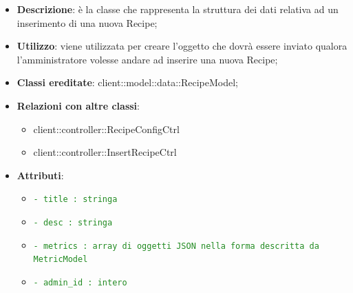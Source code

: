 			\begin{itemize}
				\item \textbf{Descrizione}: è la classe che rappresenta la struttura dei dati relativa ad un inserimento di una nuova Recipe;
				\item \textbf{Utilizzo}: viene utilizzata per creare l'oggetto che dovrà essere inviato qualora l'amministratore volesse andare ad inserire una nuova Recipe;
				\item \textbf{Classi ereditate}: client::model::data::RecipeModel;
				\item \textbf{Relazioni con altre classi}:
					\begin{itemize}
						\item client::controller::RecipeConfigCtrl
						\item client::controller::InsertRecipeCtrl
					\end{itemize}
				\item \textbf{Attributi}:
					\begin{itemize}
						\item \textcolor{forestgreen}{\texttt{- title : stringa}}
						\item \textcolor{forestgreen}{\texttt{- desc : stringa}}
						\item \textcolor{forestgreen}{\texttt{- metrics : array di oggetti JSON nella forma descritta da MetricModel}}
						\item \textcolor{forestgreen}{\texttt{- admin\_id : intero}}
					\end{itemize}
			\end{itemize}

